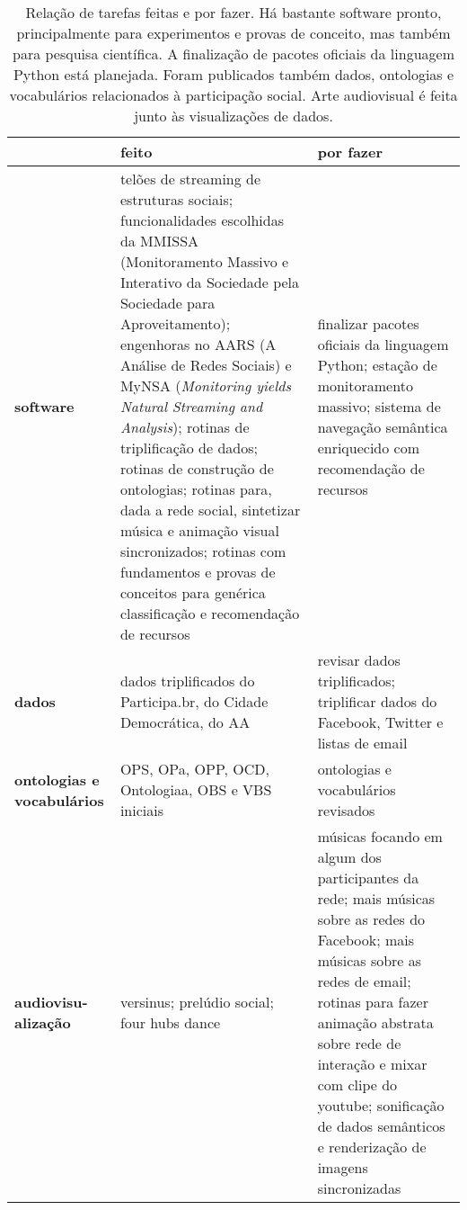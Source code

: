 \documentclass[a4paper,openright,12pt]{report} %
\begin{document}
\begin{table}[!h]
\centering
\footnotesize
\caption{ \footnotesize Relação de tarefas feitas e por fazer.
Há bastante software pronto, principalmente para experimentos
e provas de conceito, mas também para pesquisa científica.
A finalização de pacotes oficiais
da linguagem Python está planejada.
Foram publicados também dados, 
ontologias e vocabulários relacionados 
à participação social.
Arte audiovisual é feita junto às visualizações de dados.}\label{tab:afa}
\begin{tabular}{p{1.3cm}||p{7.6cm}|p{7.1cm}}\hline
    & {\bf feito} & {\bf por fazer} \\\hline
                       {\bf software}     & telões de streaming de estruturas sociais;
    funcionalidades escolhidas da MMISSA (Monitoramento Massivo e Interativo da Sociedade pela Sociedade para Aproveitamento);
    engenhoras no AARS (A Análise de Redes Sociais) e MyNSA (\emph{Monitoring yields Natural Streaming and Analysis});
                       rotinas de triplificação de dados; rotinas de construção de ontologias;
                       rotinas para, dada a rede social, sintetizar música e animação visual sincronizados;
                       rotinas com fundamentos e provas de conceitos para genérica classificação e recomendação de recursos
                       & finalizar pacotes oficiais da linguagem Python;
                       estação de monitoramento massivo;
                       sistema de navegação semântica enriquecido com recomendação de recursos
                       \\\hline
                       {\bf dados}        & dados triplificados do Participa.br, do Cidade Democrática, do AA  & revisar dados triplificados;
                       triplificar dados do Facebook, Twitter e listas de email \\\hline
                       {\bf ontologias e vocabulários}  & OPS, OPa, OPP, OCD, Ontologiaa, OBS e VBS iniciais  & ontologias e vocabulários revisados \\\hline
                       {\bf audiovisu-alização}         & versinus; prelúdio social; four hubs dance   & músicas focando em algum dos participantes da rede; mais músicas sobre as redes do Facebook; mais músicas sobre as redes de email; rotinas para fazer animação abstrata sobre rede de interação e mixar com clipe do youtube;
                       sonificação de dados semânticos e renderização de imagens sincronizadas \\\hline
\end{tabular}
\end{table}
\end{document}
